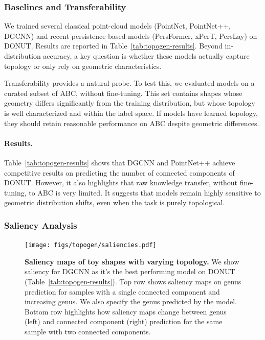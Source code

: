 \subsubsection{Baselines and Transferability}
\label{sssec:topogen-transferability}

We trained several classical point-cloud models (PointNet, PointNet++, DGCNN) and recent persistence-based models (PersFormer, xPerT, PersLay) on DONUT. Results are reported in Table~\ref{tab:topogen-results}. Beyond in-distribution accuracy, a key question is whether these models actually capture topology or only rely on geometric characteristics.

Transferability provides a natural probe. To test this, we evaluated models on a curated subset of ABC, without fine-tuning. This set contains shapes whose geometry differs significantly from the training distribution, but whose topology is well characterized and within the label space. If models have learned topology, they should retain reasonable performance on ABC despite geometric differences.

\paragraph{Results.}
Table~\ref{tab:topogen-results} shows that DGCNN and PointNet++ achieve competitive results on predicting the number of connected components of DONUT. However, it also highlights that raw knowledge transfer, without fine-tuning, to ABC is very limited. It suggests that models remain highly sensitive to geometric distribution shifts, even when the task is purely topological.




\subsubsection{Saliency Analysis}
\label{sssec:topogen-saliency}

\begin{figure}[h]
  \centering
  \texttt{[image: figs/topogen/saliencies.pdf]}
   \caption{\textbf{Saliency maps of toy shapes with varying topology.} We show saliency for DGCNN as it's the best performing model on DONUT (Table~\ref{tab:topogen-results}). Top row shows saliency maps on genus prediction for samples with a single connected component and increasing genus. We also specify the genus predicted by the model. Bottom row highlights how saliency maps change between genus (left) and connected component (right) prediction for the same sample with two connected components.}
   \label{fig:topogen-saliencies}
\end{figure}

